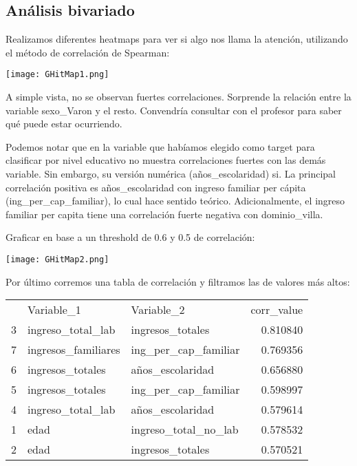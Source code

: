 \documentclass[a4paper]{article}
\begin{document}
    \newpage

    \subsection{Análisis bivariado}

        Realizamos diferentes heatmaps para ver si algo nos llama la atención, utilizando el método de correlación de Spearman:

        \texttt{[image: GHitMap1.png]}

        A simple vista, no se observan fuertes correlaciones. Sorprende la relación entre la variable sexo\_Varon y el resto. Convendría consultar con el profesor para saber qué puede estar ocurriendo.

        Podemos notar que en la variable que habíamos elegido como target para clasificar por nivel educativo no muestra correlaciones fuertes con las demás variable. Sin embargo, su versión numérica (años\_escolaridad) si. La principal correlación positiva es años\_escolaridad con ingreso familiar per cápita (ing\_per\_cap\_familiar), lo cual hace sentido teórico. Adicionalmente, el ingreso familiar per capita tiene una correlación fuerte negativa con dominio\_villa.

        Graficar en base a un threshold de 0.6 y 0.5 de correlación:

        \begin{center}
            \texttt{[image: GHitMap2.png]}
        \end{center}

        Por último corremos una tabla de correlación y filtramos las de valores más altos:


        \begin{tabular}{lllr}
             & Variable\_1 & Variable\_2 & corr\_value \\
             3 & ingreso\_total\_lab & ingresos\_totales & 0.810840 \\
             7 & ingresos\_familiares & ing\_per\_cap\_familiar & 0.769356 \\
             6 & ingresos\_totales & años\_escolaridad & 0.656880 \\
             5 & ingresos\_totales & ing\_per\_cap\_familiar & 0.598997 \\
             4 & ingreso\_total\_lab & años\_escolaridad & 0.579614 \\
             1 & edad & ingreso\_total\_no\_lab & 0.578532 \\
             2 & edad & ingresos\_totales & 0.570521 \\
        \end{tabular}
\end{document}
